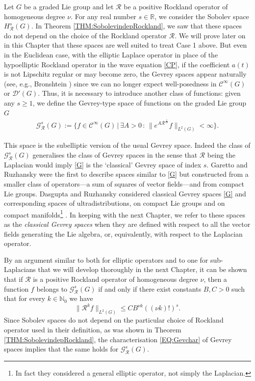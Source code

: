 \documentclass[12pt,oneside,a4paper]{book}
\numberwithin{equation}{section}     %
\theoremstyle{plain}
\theoremstyle{definition}
\newcommand{\R}{{\mathbb R}}
\begin{document}
Let $G$ be a graded Lie group and let $\mathcal R$ be a positive Rockland operator of homogeneous degree $\nu$. For any real number $s\in\R$, we consider the Sobolev space $H^s_\mathcal R(G)$. In Theorem \ref{THM:SobolevindepRockland}, we saw that these spaces do not depend on the choice of the Rockland operator $\mathcal R$. We will prove later on in this Chapter that these spaces are well suited to treat Case 1 above. But even in the Euclidean case, with the elliptic Laplace operator in place of the hypoelliptic Rockland operator in the wave equation \eqref{CP}, if the coefficient $a(t)$ is not Lipschitz regular or may become zero, the Gevrey spaces appear naturally (see, e.g., Bronshtein \cite{Bronshtein:TMMO-1980}) since we can no longer expect well-posedness in $\mathcal C^\infty(G)$ or $\mathcal D'(G)$. Thus, it is necessary to introduce another class of functions: given any $s\geq 1$, we define the Gevrey-type space of functions on the graded Lie group $G$
\begin{align}\label{G}
\mathcal G^s_{\mathcal R}(G):=\{f\in\mathcal{C}^\infty(G)\,|\,\exists A>0\,:\,\|e^{A\mathcal R^{\frac{1}{\nu s}}}f\|_{L^2(G)}<\infty\}.
\end{align}

This space is the subelliptic version of the usual Gevrey space. Indeed the class of $\mathcal{G}^s_{\mathcal{R}}(G)$ generalises the class of Gevrey spaces in the sense that $\mathcal{R}$ being the Laplacian would imply \eqref{G} is the `classical' Gevrey space of index $s$. Garetto and Ruzhansky \cite{GR2015} were the first to describe spaces similar to \eqref{G} but constructed from a smaller class of operators---a sum of squares of vector fields---and from compact Lie groups. Dasgupta and Ruzhansky considered classical Gevrey spaces \eqref{G} and corresponding spaces of ultradistributions, on compact Lie groups \cite{DR2014} and on compact manifolds\footnote{In fact they considered a general elliptic operator, not simply the Laplacian.} \cite{DR2016}. In keeping with the next Chapter, we refer to these spaces as the \textit{classical Gevrey spaces} when they are defined with respect to all the vector fields generating the Lie algebra, or, equivalently, with respect to the Laplacian operator.

By an argument similar to both \cite[Theorem 2.4]{DR2014} for elliptic operators and to one for sub-Laplacians that we will develop thoroughly in the next Chapter, it can be shown that if $\mathcal R$ is a positive Rockland operator of homogeneous degree $\nu$, then a function $f$ belongs to $\mathcal G^s_{\mathcal R}(G)$ if and only if there exist constants $B,C>0$ such that for every  $k\in\mathbb N_0$ we have
\begin{equation}\label{EQ:Gevchar}
\|\mathcal R^k f\|_{L^2(G)}\leq C B^{\nu k} ((\nu k)!)^s.
\end{equation} 
Since Sobolev spaces do not depend on the particular choice of Rockland operator used in their definition, as was shown in Theorem \ref{THM:SobolevindepRockland}, the characterisation \eqref{EQ:Gevchar} of Gevrey spaces implies that the same holds for $\mathcal G^s_{\mathcal R}(G)$. 
\end{document}
